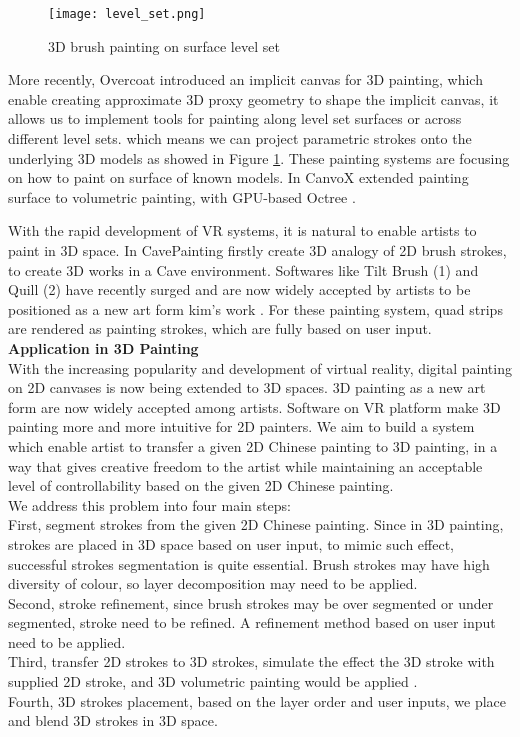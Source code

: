 \begin{figure}[H]
	\centering
	\texttt{[image: level\_set.png]}
	\caption{3D brush painting on surface level set}
	\label{level set}
\end{figure}

More recently, Overcoat \cite{schmid2011overcoat} introduced an implicit canvas for 3D painting, which enable creating approximate 3D proxy geometry to shape the implicit canvas, it allows us to implement tools for painting along level set surfaces or across different level sets. which means we can project parametric strokes onto the underlying 3D models as showed in Figure \ref{level set}.
These painting systems are focusing on how to paint on surface of known models. In CanvoX \cite{kim2017canvox} extended painting surface to volumetric painting, with GPU-based Octree \cite{lefebvre2005octree}.

With the rapid development of VR systems, it is natural to enable artists to paint in 3D space. In CavePainting \cite{keefe2001cavepainting} firstly create 3D analogy of 2D brush strokes, to create 3D works in a Cave environment. Softwares like Tilt Brush (1) and Quill (2) have recently surged and are now widely accepted by artists to be positioned as a new art form kim's work \cite{kim2017canvox}. For these painting system, quad strips are rendered as painting strokes, which are fully based on user input. \\
\textbf{Application in 3D Painting}\\
With the increasing popularity and development of virtual reality, digital painting on 2D canvases is now being extended to 3D spaces. 3D painting as a new art form are now widely accepted among artists. Software on VR platform make 3D painting more and more intuitive for 2D painters.   
We aim to build a system which enable artist to transfer a given 2D Chinese painting to 3D painting, in a way that gives creative freedom to the artist while maintaining an acceptable level of controllability based on the given 2D Chinese painting.\\
We address this problem into four main steps: \\
First, segment strokes from the given 2D Chinese painting. Since in 3D painting, strokes are placed in 3D space based on user input, to mimic such effect, successful strokes segmentation is quite essential. Brush strokes may have high diversity of colour, so layer decomposition may need to be applied. \\
Second, stroke refinement, since brush strokes may be over segmented or under segmented, stroke need to be refined. A refinement method based on user input need to be applied. \\
Third, transfer 2D strokes to 3D strokes, simulate the effect the 3D stroke with supplied 2D stroke, and 3D volumetric painting would be applied \cite{kim2017canvox}. \\
Fourth, 3D strokes placement, based on the layer order and user inputs, we place and blend 3D strokes in 3D space. \\
